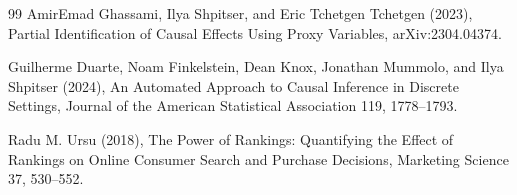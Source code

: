\documentclass{article}
\begin{document}
\begin{thebibliography}{99}
   AmirEmad Ghassami, Ilya Shpitser, and Eric Tchetgen Tchetgen (2023), Partial Identification of Causal Effects Using Proxy Variables, arXiv:2304.04374.

   Guilherme Duarte, Noam Finkelstein, Dean Knox, Jonathan Mummolo, and Ilya Shpitser (2024), An Automated Approach to Causal Inference in Discrete Settings, Journal of the American Statistical Association 119, 1778--1793.

   Radu M. Ursu (2018), The Power of Rankings: Quantifying the Effect of Rankings on Online Consumer Search and Purchase Decisions, Marketing Science 37, 530--552.

\end{thebibliography}
\end{document}
